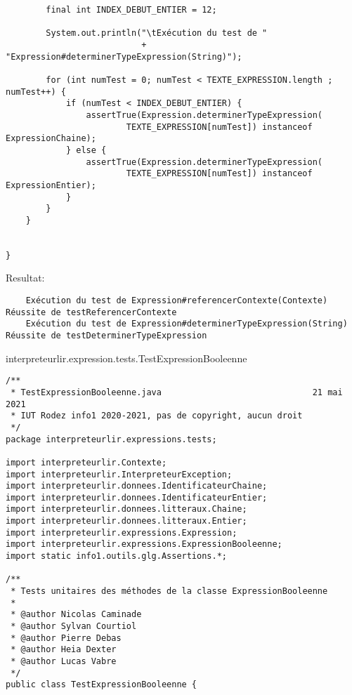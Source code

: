 \begin{enum}
\begin{verbatim}
        final int INDEX_DEBUT_ENTIER = 12;
        
        System.out.println("\tExécution du test de "
                           + "Expression#determinerTypeExpression(String)");
        
        for (int numTest = 0; numTest < TEXTE_EXPRESSION.length ; numTest++) {
            if (numTest < INDEX_DEBUT_ENTIER) {
                assertTrue(Expression.determinerTypeExpression(
                        TEXTE_EXPRESSION[numTest]) instanceof ExpressionChaine);
            } else {
                assertTrue(Expression.determinerTypeExpression(
                        TEXTE_EXPRESSION[numTest]) instanceof ExpressionEntier);
            }
        }
    }
    

}
\end{verbatim}
Resultat:
\begin{verbatim}
    Exécution du test de Expression#referencerContexte(Contexte)
Réussite de testReferencerContexte
    Exécution du test de Expression#determinerTypeExpression(String)
Réussite de testDeterminerTypeExpression
\end{verbatim}

    \item interpreteurlir.expression.tests.TestExpressionBooleenne
\begin{verbatim}
/**
 * TestExpressionBooleenne.java                              21 mai 2021
 * IUT Rodez info1 2020-2021, pas de copyright, aucun droit
 */
package interpreteurlir.expressions.tests;

import interpreteurlir.Contexte;
import interpreteurlir.InterpreteurException;
import interpreteurlir.donnees.IdentificateurChaine;
import interpreteurlir.donnees.IdentificateurEntier;
import interpreteurlir.donnees.litteraux.Chaine;
import interpreteurlir.donnees.litteraux.Entier;
import interpreteurlir.expressions.Expression;
import interpreteurlir.expressions.ExpressionBooleenne;
import static info1.outils.glg.Assertions.*;

/** 
 * Tests unitaires des méthodes de la classe ExpressionBooleenne
 * 
 * @author Nicolas Caminade
 * @author Sylvan Courtiol
 * @author Pierre Debas
 * @author Heia Dexter
 * @author Lucas Vabre
 */
public class TestExpressionBooleenne {
    

\end{verbatim}
\end{enum}
